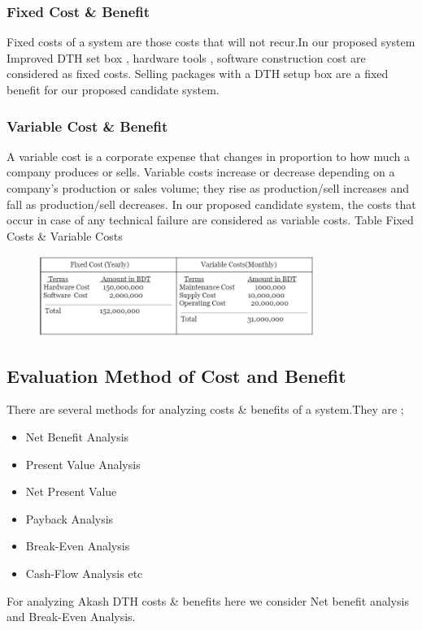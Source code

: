 \begin{spacing}{1}
\subsubsection{Fixed Cost \& Benefit}
Fixed costs of a system are those costs that will not recur.In our proposed system Improved DTH set box , hardware tools , software construction cost are considered as fixed costs. Selling packages with a DTH setup box are a fixed benefit for our proposed candidate system. 

\subsubsection{Variable Cost \& Benefit}
A variable cost is a corporate expense that changes in proportion to how much a company produces or sells. Variable costs increase or decrease depending on a company's production or sales volume; they rise as production/sell increases and fall as production/sell decreases. In our proposed candidate system, the costs that occur in case of any technical failure are considered as variable costs. 
Table Fixed Costs \& Variable Costs 
\begin{figure}[H]
	\centering
	\includegraphics[width=0.8\textwidth]{cost}
	\label{fig:cost}
\end{figure}

\subsection{Evaluation Method of Cost and Benefit }
There are several methods for analyzing costs \& benefits of a system.They are ; 
\begin {itemize}
\item Net Benefit Analysis
\item Present Value Analysis
\item Net Present Value
\item Payback Analysis
\item Break-Even Analysis
\item Cash-Flow Analysis etc
\end{itemize}
For analyzing Akash DTH costs \& benefits here we consider Net benefit analysis and Break-Even Analysis.


\end{spacing}
